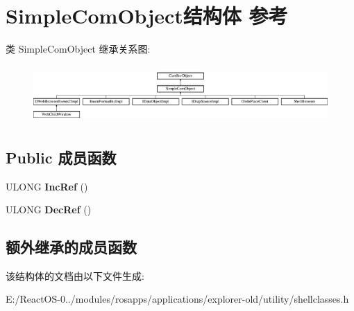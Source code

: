 \hypertarget{struct_simple_com_object}{}\section{Simple\+Com\+Object结构体 参考}
\label{struct_simple_com_object}
类 Simple\+Com\+Object 继承关系图\+:\begin{figure}[H]
\begin{center}
\leavevmode
\includegraphics[height=2.222222cm]{struct_simple_com_object}
\end{center}
\end{figure}
\subsection*{Public 成员函数}
\begin{DoxyCompactItemize}
\item 
\mbox{\label{struct_simple_com_object_a4456db197a5990c6554c939612ff432b}} 
U\+L\+O\+NG {\bfseries Inc\+Ref} ()
\item 
\mbox{\label{struct_simple_com_object_a2806c08c4ca49fc26fe8aad291f0bfa4}} 
U\+L\+O\+NG {\bfseries Dec\+Ref} ()
\end{DoxyCompactItemize}
\subsection*{额外继承的成员函数}


该结构体的文档由以下文件生成\+:\begin{DoxyCompactItemize}
\item 
E\+:/\+React\+O\+S-\/0../modules/rosapps/applications/explorer-\/old/utility/shellclasses.\+h\end{DoxyCompactItemize}
